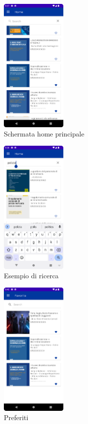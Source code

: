 \begin{multicols}{3}
            \begin{figure}[H]
                \centering
                \includegraphics[width=0.29\textwidth]{img/home.png}
                \caption{Schermata home principale}
                \label{home-android}
            \end{figure}
            
            \begin{figure}[H]
                \centering
                \includegraphics[width=0.29\textwidth]{img/ricerca.png}
                \caption{Esempio di ricerca}
                \label{ricerca-android}
            \end{figure}

            \begin{figure}[H]
                \centering
                \includegraphics[width=0.29\textwidth]{img/preferiti.png}
                \caption{Preferiti}
                \label{preferiti-android}
            \end{figure}


\end{multicols}

